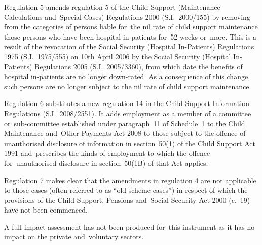 \documentclass[12pt,a4paper]{article}
\begin{document}
Regulation 5 amends regulation 5 of the Child Support (Maintenance Calculations and~Special Cases) Regulations 2000 (S.I.~2000/155) by removing from the categories of persons liable for~the nil rate of child support maintenance those persons who have been hospital in-patients for~52 weeks or~more. This is a result of the revocation of the Social Security (Hospital In-Patients) Regulations 1975 (S.I.~1975/555) on 10th April 2006 by the Social Security (Hospital In-Patients) Regulations 2005 (S.I.~2005/3360), from which date the benefits of hospital in-patients are no longer down-rated. As a consequence of this change, such persons are no longer subject to the nil rate of child support maintenance.

Regulation 6 substitutes a new regulation 14 in the Child Support Information Regulations (S.I.~2008/2551). It adds employment as a member of a committee or~sub-committee established under paragraph~11 of Schedule~1 to the Child Maintenance and~Other Payments Act 2008 to those subject to the offence of unauthorised disclosure of information in section~50(1) of the Child Support Act 1991 and~prescribes the kinds of employment to which the offence for~unauthorised disclosure in section~50(1B) of that Act applies.

Regulation 7 makes clear that the amendments in regulation 4 are not applicable to those cases (often referred to as “old scheme cases”) in respect of which the provisions of the Child Support, Pensions and~Social Security Act 2000 (c.~19) have not been commenced.

A full impact assessment has not been produced for~this instrument as it has no impact on the private and~voluntary sectors. 
\end{document}
